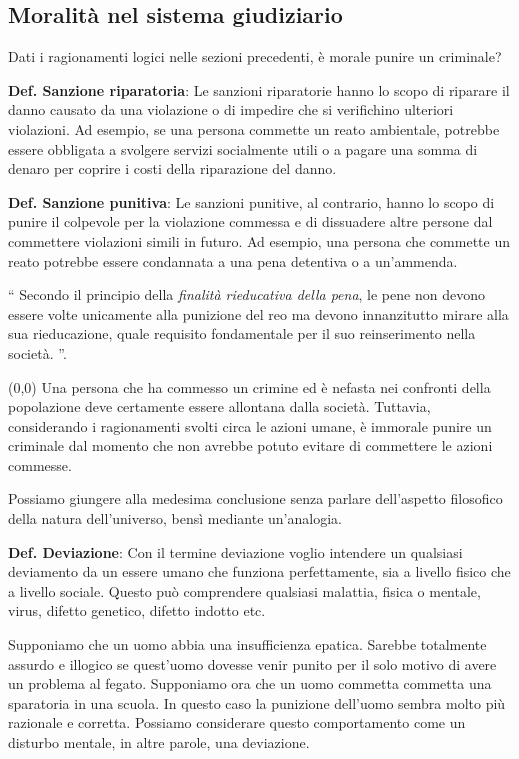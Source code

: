 \documentclass[a4paper, 12pt]{article}
\newcommand{\ownright}[0]{%
    \makebox(0,0){
        \stackon[8pt]{\phantom{A}}{
            \begin{tikzpicture}
                \fill (0,0) -- (0,0.3) -- ++(0.05,0) -- (0.05,0);
                \fill (0,0.3) -- ++(0.3,0) -- (0.3,0.25) -- (0.05,0.25);
            \end{tikzpicture}
        }
    }%
}
\begin{document}
\subsection{Moralità nel sistema giudiziario}

Dati i ragionamenti logici nelle sezioni precedenti, è morale punire
un criminale?

\textbf{Def. Sanzione riparatoria}: Le sanzioni riparatorie hanno
lo scopo di riparare il danno causato da una violazione
o di impedire che si verifichino ulteriori violazioni.
Ad esempio, se una persona commette un reato ambientale,
potrebbe essere obbligata a svolgere servizi socialmente utili
o a pagare una somma di denaro per coprire i costi della riparazione del danno.

\textbf{Def. Sanzione punitiva}: Le sanzioni punitive,
al contrario, hanno lo scopo di punire il colpevole
per la violazione commessa e di dissuadere altre persone
dal commettere violazioni simili in futuro.
Ad esempio, una persona che commette un reato potrebbe essere condannata
a una pena detentiva o a un'ammenda.

\enquote{
Secondo il principio della \textit{finalità rieducativa della pena}, le pene
non devono essere volte unicamente alla punizione del reo ma
devono innanzitutto mirare alla sua rieducazione,
quale requisito fondamentale per il suo reinserimento nella società.
}\cite{rieducazione}.

\ownright{}%
Una persona che ha commesso un crimine ed è nefasta
nei confronti della popolazione deve certamente essere allontana dalla società.
Tuttavia, considerando i ragionamenti svolti circa le azioni umane,
è immorale punire un criminale dal momento che non avrebbe potuto evitare di commettere
le azioni commesse.

Possiamo giungere alla medesima conclusione senza parlare
dell'aspetto filosofico della natura dell'universo, bensì mediante un'analogia.

\textbf{Def. Deviazione}: Con il termine deviazione voglio intendere
un qualsiasi deviamento da un essere umano che funziona perfettamente,
sia a livello fisico che a livello sociale. Questo può comprendere
qualsiasi malattia, fisica o mentale, virus, difetto genetico,
difetto indotto etc.

Supponiamo che un uomo abbia una insufficienza epatica.
Sarebbe totalmente assurdo e illogico se quest'uomo dovesse venir
punito per il solo motivo di avere un problema al fegato.
Supponiamo ora che un uomo commetta commetta una sparatoria in una scuola.
In questo caso la punizione dell'uomo sembra molto più razionale e corretta.
Possiamo considerare questo comportamento come un disturbo mentale, in altre parole,
una deviazione.
\end{document}
